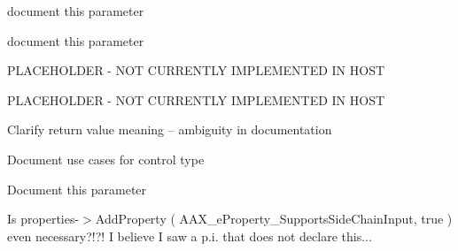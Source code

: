 \begin{DoxyRefList}
%
document this parameter  
\item[Member \mbox{\hyperlink{a02069_aa8443e720e48046444a2e9f712f0864b}{AAX\+\_\+\+IComponent\+Descriptor\+::Add\+Process\+Proc\+\_\+\+TI}} (const char in\+DLLFile\+Name\+UTF8\mbox{[}\mbox{]}, const char in\+Process\+Proc\+Symbol\mbox{[}\mbox{]}, \mbox{\hyperlink{a02157}{AAX\+\_\+\+IProperty\+Map}} $\ast$in\+Properties, const char in\+Instance\+Init\+Proc\+Symbol\mbox{[}\mbox{]}=NULL, const char in\+Background\+Proc\+Symbol\mbox{[}\mbox{]}=NULL, AAX\+\_\+\+CSelector $\ast$out\+Proc\+ID=NULL)=0]\label{a00800__todo000044}%
%
document this parameter  
\item[Member \mbox{\hyperlink{a02077_a26e009667f9cd6c3cccd45b862108bf4}{AAX\+\_\+\+IController\+::Get\+Cycle\+Count}} (AAX\+\_\+\+EProperty in\+Which\+Cycle\+Count, AAX\+\_\+\+CProperty\+Value $\ast$out\+Num\+Cycles) const =0]\label{a00800__todo000046}%
%
PLACEHOLDER -\/ NOT CURRENTLY IMPLEMENTED IN HOST  
\item[Member \mbox{\hyperlink{a02077_a1a654f682357d48bafd506cbbea2ae25}{AAX\+\_\+\+IController\+::Set\+Cycle\+Count}} (AAX\+\_\+\+EProperty $\ast$in\+Which\+Cycle\+Counts, AAX\+\_\+\+CProperty\+Value $\ast$i\+Values, int32\+\_\+t num\+Values)=0]\label{a00800__todo000047}%
%
PLACEHOLDER -\/ NOT CURRENTLY IMPLEMENTED IN HOST  
\item[Member \mbox{\hyperlink{a02097_a44981285d022e5ddee41d903eed68a7d}{AAX\+\_\+\+IDma\+::Is\+Transfer\+Complete}} ()=0]\label{a00800__todo000048}%
%
Clarify return value meaning -- ambiguity in documentation 
\item[Member \mbox{\hyperlink{a02145_a0c096b4092b2146d9aa0413bceeaac48}{AAX\+\_\+\+IParameter\+::Get\+Type}} () const =0]\label{a00800__todo000049}%
%
Document use cases for control type  
\item[Member \mbox{\hyperlink{a02145_a809a5c7f712ed2e5c55e30b6d5557c59}{AAX\+\_\+\+IParameter\+::Set\+Taper\+Delegate}} (\mbox{\hyperlink{a02165}{AAX\+\_\+\+ITaper\+Delegate\+Base}} \&in\+Taper\+Delegate, bool in\+Preserve\+Value)=0]\label{a00800__todo000050}%
%
Document this parameter  
\item[Module \mbox{\hyperlink{a00823}{additional\+Features\+\_\+\+Sidechain}} ]\label{a00800__todo000001}%
%
Is properties-\/$>$Add\+Property ( AAX\+\_\+e\+Property\+\_\+\+Supports\+Side\+Chain\+Input, true ) even necessary?!?! I believe I saw a p.\+i. that does not declare this... 

\end{DoxyRefList}
